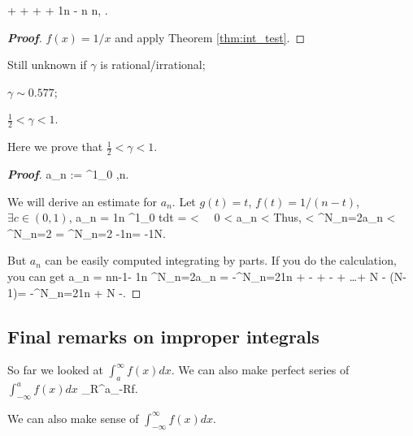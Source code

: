 \begin{corollary}
+ +  + \cdots + \frac 1n - \log n\to \gamma {} n\to \infty, \leq \gamma {}.
\ee
\end{corollary}

\begin{proof}[{\bf Proof}]
$f(x)=1/x$ and apply Theorem \ref{thm:int_test}.
\end{proof}

\begin{remark}
\ben
\item Still unknown if $\gamma$ is rational/irrational;

\item $\gamma \sim 0.577$;

\item $\frac 12 < \gamma < 1$.
\een
\end{remark}

Here we prove that $\frac 12 < \gamma < 1$.

\begin{proof}[{\bf Proof}]
\be
a_n := \int^1_0 ,\quad n.
\ee

We will derive an estimate for $a_n$. Let $g(t) = t$, $f(t) = 1/(n-t)$, $\exists c\in (0,1)$,
\be
a_n = \frac 1n \int^1_0 tdt =  < \ \ra \ 0 < a_n < 
\ee
Thus,
 < \sum^N_{n=2}a_n < \sum^N_{n=2} =  \sum^N_{n=2}\lob{} -\frac 1n\rob =   -\frac 1N\rob\to {}.
\ee

But $a_n$ can be easily computed integrating by parts. If you do the calculation, you can get
\be
a_n = \log\lob\frac n{n-1}\rob - \frac 1n
\ee
\be
\sum^N_{n=2}a_n = -\sum^N_{n=2}\frac 1n + \lob {} - \rob + \lob {} - \rob + \dots + \lob \log N - \log (N-1)\rob  = -\sum^N_{n=2}\frac 1n + \log N  -\gamma.
\ee
\end{proof}

\subsection{Final remarks on improper integrals}

So far we looked at $\int^\infty_a f(x)dx$. We can also make perfect series of $\int^a_{-\infty}f(x)dx$
\be
\lim_{R\to\infty}\int^a_{-R}f.
\ee

We can also make sense of $\int^\infty_{-\infty}f(x)dx$.

